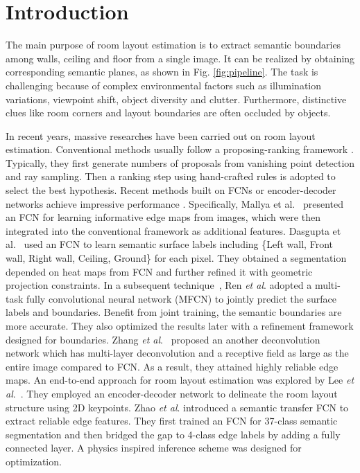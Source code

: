 \section{Introduction}
\label{sec:intro}

The main purpose of room layout estimation is to extract semantic boundaries among walls, ceiling and floor from a single image. It can be realized by obtaining corresponding semantic planes, as shown in Fig. \ref{fig:pipeline}. The task is challenging because of complex environmental factors such as illumination variations, viewpoint shift, object diversity and clutter. Furthermore, distinctive clues like room corners and layout boundaries are often occluded by objects. 

In recent years, massive researches have been carried out on room layout estimation. Conventional methods usually follow a proposing-ranking framework \cite{hedau2009recovering,wang2013discriminative,gupta2010estimating,hedau2010thinking}. Typically, they first generate numbers of proposals from vanishing point detection and ray sampling. Then a ranking step using hand-crafted rules is adopted to select the best hypothesis. Recent methods built on FCNs \cite{long2015fully} or encoder-decoder networks achieve impressive performance \cite{mallya2015learning,ren2016coarse,zhang2017learning,dasgupta2016delay,LeeRoomNet17,zhao2017physics}. Specifically, 
%
Mallya et al.~\cite{mallya2015learning} presented an FCN for learning informative edge maps from images, which were then integrated into the conventional framework as additional features. 
%
Dasgupta et al.~\cite{dasgupta2016delay} used an FCN to learn semantic surface labels including \{Left wall, Front wall, Right wall, Ceiling, Ground\} for each pixel. They obtained a segmentation depended on heat maps from FCN and further refined it with geometric projection constraints.
% 
In a subsequent technique~\cite{ren2016coarse}, Ren \emph{et al}. adopted a multi-task fully convolutional neural network (MFCN) to jointly predict the surface labels and boundaries. Benefit from joint training, the semantic boundaries are more accurate. They also optimized the results later with a refinement framework designed for boundaries.
% 
Zhang \emph{et al}.~\cite{zhang2017learning} proposed an another deconvolution network which has multi-layer deconvolution and a receptive field as large as the entire image compared to FCN. As a result, they attained highly reliable edge maps. 
%
An end-to-end approach for room layout estimation was explored by Lee \emph{et al}.~\cite{LeeRoomNet17}. They employed an encoder-decoder network to delineate the room layout structure using 2D keypoints.
%
Zhao \emph{et al}. \cite{zhao2017physics} introduced a semantic transfer FCN to extract reliable edge features. They first trained an FCN for 37-class semantic segmentation and then bridged the gap to 4-class edge labels by adding a fully connected layer. A physics inspired inference scheme was designed for optimization.


